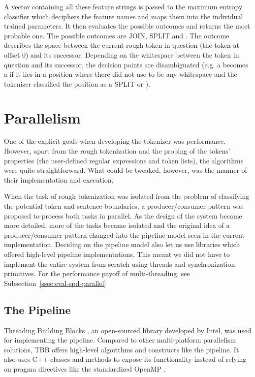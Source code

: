 A vector containing all these feature strings is passed to the maximum entropy
classifier which deciphers the feature names and maps them into the individual
trained parameters. It then evaluates the possible outcomes and returns the
most probable one. The possible outcomes are JOIN, SPLIT and \breaksentence{}.
The outcome describes the space between the current rough token in question
(the token at offset 0) and its successor. Depending on the whitespace between
the token in question and its successor, the decision points are disambiguated
(e.g. a \maysplit{} becomes a \dosplit{} if it lies in a position where there
did not use to be any whitespace and the tokenizer classified the position as a
SPLIT or \breaksentence{}).


\section{Parallelism}
\label{sec:impl-parallel}

One of the explicit goals when developing the tokenizer was performance.
However, apart from the rough tokenization and the probing of the tokens'
properties (the user-defined regular expressions and token lists), the
algorithms were quite straightforward. What could be tweaked, however, was the
manner of their implementation and execution. 

When the task of rough tokenization was isolated from the problem of
classifying the potential token and sentence boundaries, a producer/consumer
pattern was proposed to process both tasks in parallel. As the design of the
system became more detailed, more of the tasks became isolated and the original
idea of a producer/consumer pattern changed into the pipeline model seen in the
current implementation. Deciding on the pipeline model also let us use
libraries which offered high-level pipeline implementations. This meant we did
not have to implement the entire system from scratch using threads and
synchronization primitives. For the performance payoff of multi-threading, see
Subsection~\ref{ssec:eval-spd-parallel}

\subsection{The Pipeline}
\label{ssec:impl-parallel-pipeline}

Threading Building Blocks \cite{web-tbb}, an open-sourced library developed by
Intel, was used for implementing the pipeline. Compared to other multi-platform
parallelism solutions, TBB offers high-level algorithms and constructs like the
pipeline. It also uses C++ classes and methods to expose its functionality
instead of relying on pragma directives like the standardized OpenMP
\cite{web-openmp}. 

